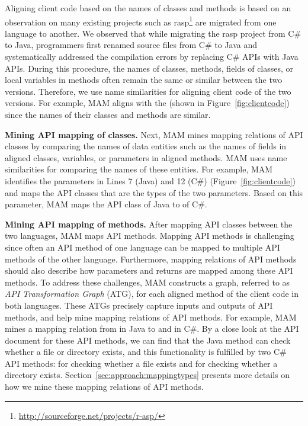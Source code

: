 Aligning client code based on the names of classes and methods is based
on an observation on many existing projects such as
rasp\footnote{\url{http://sourceforge.net/projects/r-asp/}} are
migrated from one language to another. We observed that while
migrating the rasp project from C\# to Java, programmers first
renamed source files from C\# to Java and systematically addressed
the compilation errors by replacing C\# APIs with Java APIs. During
this procedure, the names of classes, methods, fields of classes, or
local variables in methods often remain the same or similar between
the two versions. Therefore, we use name similarities for aligning
client code of the two versions. For example, MAM aligns
 with the  (shown in
Figure~\ref{fig:clientcode}) since the names of their classes and
methods are similar.

\textbf{Mining API mapping of classes.} Next, MAM mines mapping
relations of API classes by comparing the names of data entities such as the names of
fields in aligned classes, variables, or parameters in aligned
methods. MAM uses name similarities for comparing the names of these
entities. For example, MAM identifies the  parameters in
Lines 7 (Java) and 12 (C\#) (Figure~\ref{fig:clientcode}) and maps
the API classes that are the types of the two parameters. Based on this
parameter, MAM maps the API class  of Java
to  of C\#.

\textbf{Mining API mapping of methods.} After mapping API classes
between the two languages, MAM maps API methods. Mapping API methods
is challenging since often an API method of one language can be
mapped to multiple API methods of the other language. Furthermore,
mapping relations of API methods should also describe how parameters
and returns are mapped among these API methods. To address these challenges,
MAM constructs a graph, referred to as \emph{API Transformation
Graph} (ATG), for each aligned method of the client code in both
languages. These ATGs precisely capture inputs and outputs of API
methods, and help mine mapping relations of API methods.
For example, MAM mines a mapping relation from  in Java to 
 and  in C\#. 
By a close look at the API document for these API methods, we can find that the Java method can check whether a file or directory exists, and this functionality is fulfilled by two C\# API methods:  for checking whether a file exists and  for checking whether a directory exists. Section~\ref{sec:approach:mappingtypes} presents more details on how
we mine these mapping relations of API methods.

